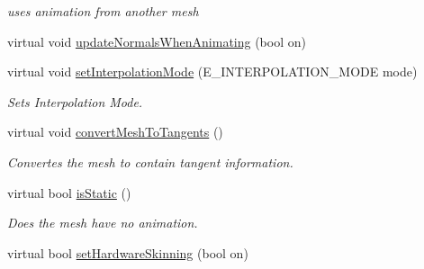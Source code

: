 \begin{DoxyCompactItemize}
\begin{DoxyCompactList}\small\item\em uses animation from another mesh \end{DoxyCompactList}\item 
virtual void \hyperlink{classirr_1_1scene_1_1_c_skinned_mesh_a5e8d7566ad703483e273668dc7822ae0}{update\-Normals\-When\-Animating} (bool on)
\item 
\hypertarget{classirr_1_1scene_1_1_c_skinned_mesh_a933028d87c7b4dfec68b850d98464826}{virtual void \hyperlink{classirr_1_1scene_1_1_c_skinned_mesh_a933028d87c7b4dfec68b850d98464826}{set\-Interpolation\-Mode} (E\-\_\-\-I\-N\-T\-E\-R\-P\-O\-L\-A\-T\-I\-O\-N\-\_\-\-M\-O\-D\-E mode)}\label{classirr_1_1scene_1_1_c_skinned_mesh_a933028d87c7b4dfec68b850d98464826}

\begin{DoxyCompactList}\small\item\em Sets Interpolation Mode. \end{DoxyCompactList}\item 
\hypertarget{classirr_1_1scene_1_1_c_skinned_mesh_aebea4d54bbb8860db8fee429949c729d}{virtual void \hyperlink{classirr_1_1scene_1_1_c_skinned_mesh_aebea4d54bbb8860db8fee429949c729d}{convert\-Mesh\-To\-Tangents} ()}\label{classirr_1_1scene_1_1_c_skinned_mesh_aebea4d54bbb8860db8fee429949c729d}

\begin{DoxyCompactList}\small\item\em Convertes the mesh to contain tangent information. \end{DoxyCompactList}\item 
\hypertarget{classirr_1_1scene_1_1_c_skinned_mesh_a22724aef8d318614c211d1bc3871161d}{virtual bool \hyperlink{classirr_1_1scene_1_1_c_skinned_mesh_a22724aef8d318614c211d1bc3871161d}{is\-Static} ()}\label{classirr_1_1scene_1_1_c_skinned_mesh_a22724aef8d318614c211d1bc3871161d}

\begin{DoxyCompactList}\small\item\em Does the mesh have no animation. \end{DoxyCompactList}\item 
\hypertarget{classirr_1_1scene_1_1_c_skinned_mesh_a5375a29e2f0e7b4f4b6392a8a0b79d8b}{virtual bool \hyperlink{classirr_1_1scene_1_1_c_skinned_mesh_a5375a29e2f0e7b4f4b6392a8a0b79d8b}{set\-Hardware\-Skinning} (bool on)}\label{classirr_1_1scene_1_1_c_skinned_mesh_a5375a29e2f0e7b4f4b6392a8a0b79d8b}


\end{DoxyCompactItemize}
